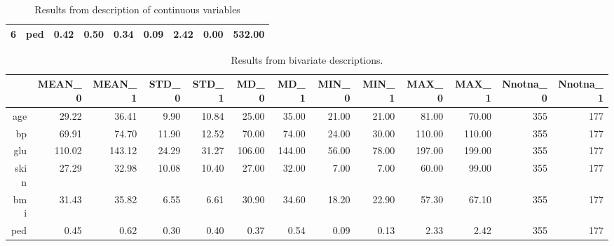 \documentclass[12pt]{article}
\begin{document}
\begin{landscape}
\begin{table}[ht]
\begin{tabular}{rlrrrrrrr}
  6 & ped & 0.42 & 0.50 & 0.34 & 0.09 & 2.42 & 0.00 & 532.00 \\ 
   \hline
\end{tabular}
\caption{Results from description of continuous variables} 
\label{tab:descont}
\end{table}
\newpage
\begin{table}[ht]
\centering
\begin{tabular}{rrrrrrrrrrrrr}
  \hline
 & MEAN\_0 & MEAN\_1 & STD\_0 & STD\_1 & MD\_0 & MD\_1 & MIN\_0 & MIN\_1 & MAX\_0 & MAX\_1 & Nnotna\_0 & Nnotna\_1 \\ 
  \hline
age & 29.22 & 36.41 & 9.90 & 10.84 & 25.00 & 35.00 & 21.00 & 21.00 & 81.00 & 70.00 & 355 & 177 \\ 
  bp & 69.91 & 74.70 & 11.90 & 12.52 & 70.00 & 74.00 & 24.00 & 30.00 & 110.00 & 110.00 & 355 & 177 \\ 
  glu & 110.02 & 143.12 & 24.29 & 31.27 & 106.00 & 144.00 & 56.00 & 78.00 & 197.00 & 199.00 & 355 & 177 \\ 
  skin & 27.29 & 32.98 & 10.08 & 10.40 & 27.00 & 32.00 & 7.00 & 7.00 & 60.00 & 99.00 & 355 & 177 \\ 
  bmi & 31.43 & 35.82 & 6.55 & 6.61 & 30.90 & 34.60 & 18.20 & 22.90 & 57.30 & 67.10 & 355 & 177 \\ 
  ped & 0.45 & 0.62 & 0.30 & 0.40 & 0.37 & 0.54 & 0.09 & 0.13 & 2.33 & 2.42 & 355 & 177 \\ 
   \hline
\end{tabular}
\caption{Results from bivariate descriptions.} 
\label{tab:descbiv}
\end{table}
\newpage

\end{landscape}
\end{document}
